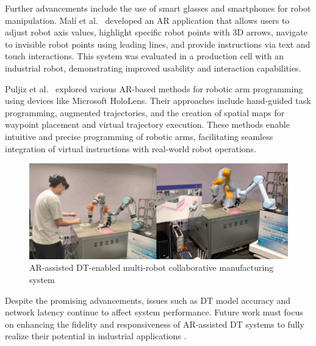 \begin{enumerate}
    Further advancements include the use of smart glasses and smartphones for robot manipulation. Malí et al.~\cite{7819154} developed an \ac{AR} 
    application that allows users to adjust robot axis values, highlight specific robot points with 3D arrows, navigate to invisible robot points using
    leading lines, and provide instructions via text and touch interactions. This system was evaluated in a production cell with an industrial robot, 
    demonstrating improved usability and interaction capabilities.

    Puljiz et al.~\cite{puljiz2019conceptsendtoendaugmentedreality,puljiz2} explored various AR-based methods for robotic arm programming using devices like Microsoft HoloLens. 
    Their approaches include hand-guided task programming, augmented trajectories, and the creation of spatial maps for waypoint placement and virtual 
    trajectory execution. These methods enable intuitive and precise programming of robotic arms, facilitating seamless integration of virtual instructions 
    with real-world robot operations.
    
    \begin{figure}[h]
        \centering
        \includegraphics[width=0.8\linewidth]{figs/physical-digital.png}
        \caption{\ac{AR}-assisted \ac{DT}-enabled multi-robot collaborative manufacturing system \cite{LI2022102321}}
        \label{fig:physical-digital}
    \end{figure}
    
    Despite the promising advancements, issues such as \ac{DT} model accuracy and network latency continue to affect system performance. Future work must 
    focus on enhancing the fidelity and responsiveness of \ac{AR}-assisted \ac{DT} systems to fully realize their potential in industrial applications 
    \cite{LI2022102321}.
\end{enumerate}


